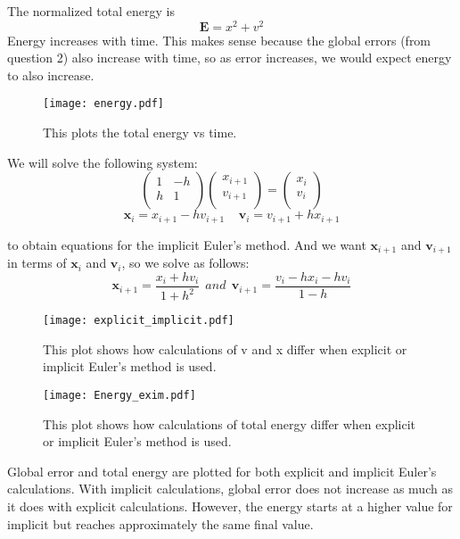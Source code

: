 \documentclass[letterpaper,ams,secnumarabic,balancelastpage,amsmath,amssymb,nofootinbib]{revtex4}
\begin{document}
\begin{enumerate}
{\large\item \textbf{}}
The normalized total energy is
$$\mathbf E = x^{2} + v^{2} $$
Energy increases with time. This makes sense because the global errors (from question 2) also increase with time, so as error increases, we would expect energy to also increase.
\begin{figure}[h]
\texttt{[image: energy.pdf]}
\caption{This plots the total energy vs time.}
\end{figure}


{\large\item \textbf{}}
We will solve the following system:
$$
\begin{pmatrix}
1 & -h \\
h & 1 \\
\end{pmatrix}
\begin{pmatrix}
x_{i+1} \\
v_{i+1} \\
\end{pmatrix}
=
\begin{pmatrix}
x_{i} \\
v_{i} \\
\end{pmatrix}
$$
$$
\mathbf  x_{i} = x_{i+1} - hv_{i+1}
~~~~~
\mathbf  v_{i} = v_{i+1} + hx_{i+1}
$$

to obtain equations for the implicit Euler's method.
And we want 
$\mathbf x_{i+1} $
and
$\mathbf v_{i+1} $
in terms of
$\mathbf x_{i} $
and
$\mathbf v_{i} $,
so we solve as follows:
$$
\mathbf x_{i+1} = \frac{x_{i} + hv_{i}}{1 + h^{2}}
~~and~~
\mathbf v_{i+1} = \frac{v_{i} - hx_{i} - hv_{i}}{1 - h}
$$


\begin{figure}[h]
\texttt{[image: explicit\_implicit.pdf]}
\caption{This plot shows how calculations of v and x differ when explicit or implicit Euler's method is used.}
\end{figure}

\begin{figure}[h]
\texttt{[image: Energy\_exim.pdf]}
\caption{This plot shows how calculations of total energy differ when explicit or implicit Euler's method is used.}
\end{figure}

Global error and total energy are plotted for both explicit and implicit Euler's calculations. With implicit calculations, global error does not increase as much as it does with explicit calculations. However, the energy starts at a higher value for implicit but reaches approximately the same final value.

\end{enumerate}
\end{document}
